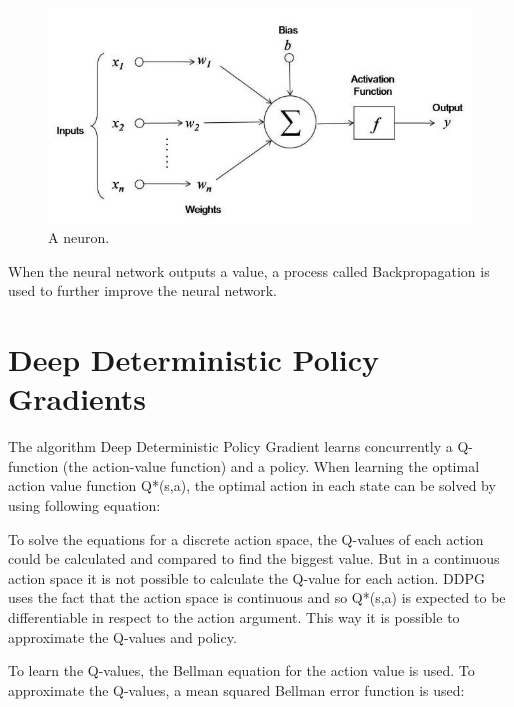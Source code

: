 \begin{figure}
	
	\centering
	\includegraphics[width=1\textwidth]{figures/neuron.jpeg}
	\caption{A neuron. %
	}
\end{figure}

When the neural network outputs a value, a process called Backpropagation is used to further improve the neural network.
 

\vspace{1cm}



\section{Deep Deterministic Policy Gradients}

The algorithm Deep Deterministic Policy Gradient learns concurrently a Q-function (the action-value function) and a policy.
When learning the optimal action value function Q*(s,a), the optimal action in each state can be solved by using following equation:


To solve the equations for a discrete action space, the Q-values of each action could be calculated and compared to find the biggest value. But in a continuous action space it is not possible to calculate the Q-value for each action. DDPG uses the fact that the action space is continuous and so Q*(s,a) is expected to be differentiable in respect to the action argument. %
This way it is possible to approximate the Q-values and policy.

To learn the Q-values, the Bellman equation for the action value is used. To approximate the Q-values, a mean squared Bellman error function is used:



